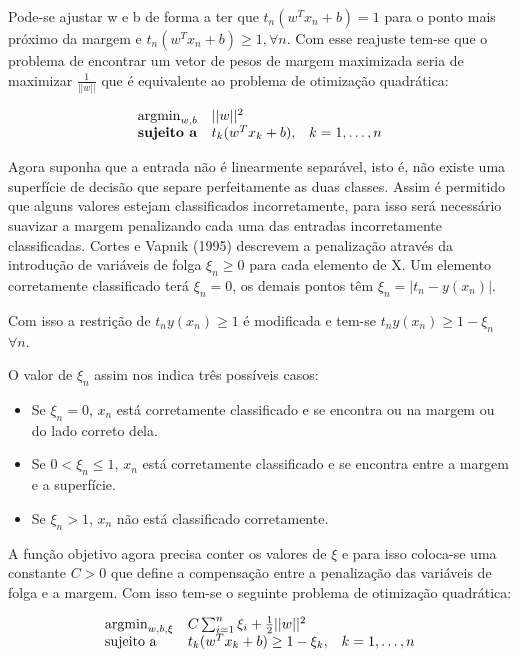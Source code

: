 Pode-se ajustar w e b de forma a ter que $t_n(w^Tx_n + b) = 1$ para o ponto mais
próximo da margem e $t_n(w^Tx_n + b) \ge 1, \forall n$. Com esse reajuste tem-se que o
problema de encontrar um vetor de pesos de margem maximizada seria de maximizar 
$\frac{1}{||w||}$ que é equivalente ao problema de otimização quadrática:

\begin{center}
	\begin{equation}
		\begin{array}{ll@{}ll}
				\argmin_{w, b} & ||w||^2 &\\
				\textbf{sujeito a}& t_k(w^Tx_k + b), &&k = 1, \ldots ,n 
		\end{array}
	\end{equation}
\end{center}

Agora suponha que a entrada não é linearmente separável, 
isto é, não existe uma superfície de decisão que separe perfeitamente as duas classes. Assim
é permitido que alguns valores estejam classificados incorretamente, para isso
será necessário suavizar a margem penalizando cada uma das entradas incorretamente
classificadas. Cortes e Vapnik (1995)\cite{cortesVapnik1995} descrevem a penalização
através da introdução de variáveis de folga $\xi_n \ge 0$ para cada elemento de X.
Um elemento corretamente classificado terá $\xi_n = 0$, os demais pontos têm
 $\xi_n = |t_n - y(x_n)|$.
 
Com isso a restrição de $t_ny(x_n) \ge 1$ é modificada e tem-se 
$t_ny(x_n) \ge 1 - \xi_n$  $\forall n$.

O valor de $\xi_n$ assim nos indica três possíveis casos:

\begin{itemize}
	\item Se $\xi_n = 0$, $x_n$ está corretamente classificado e se encontra
	ou na margem ou do lado correto dela.
	\item Se $0 < \xi_n \le 1$, $x_n$ está corretamente classificado e se encontra
	entre a margem e a superfície.
	\item Se $\xi_n > 1$, $x_n$ não está classificado corretamente.
\end{itemize}

A função objetivo agora precisa conter os valores de $\xi$ e para isso coloca-se
uma constante $C > 0$ que define a compensação entre a penalização das variáveis de
folga e a margem. Com isso tem-se o seguinte problema de otimização quadrática:

\begin{center}
	\begin{equation}
		\begin{array}{ll@{}ll}
			\argmin_{w, b, \xi} & C\sum_{i = 1}^n\xi_i + \frac{1}{2}||w||^2 &\\
			\text{sujeito a}& t_k(w^Tx_k + b) \ge 1 - \xi_k, && k = 1, \ldots, n
		\end{array}
	\end{equation}
\end{center}

